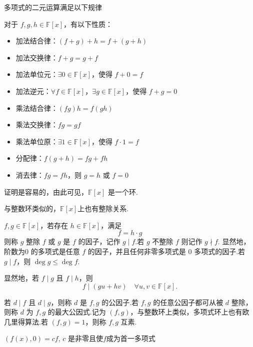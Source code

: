 多项式的二元运算满足以下规律
\begin{proposition}
	对于 \( f, g, h \in \mathbb{F}[x] \)，有以下性质：
	
	\begin{itemize}
		\item[A1.] 加法结合律：\( (f + g) + h = f + (g + h) \)
		\item[A2.] 加法交换律：\( f + g = g + f \)
		\item[A3.] 加法单位元：\( \exists 0 \in \mathbb{F}[x] \)，使得 \( f + 0 = f \)
		\item[A4.] 加法逆元：\( \forall f \in \mathbb{F}[x] \)，\( \exists g \in \mathbb{F}[x] \)，使得 \( f + g = 0 \)
		\item[M1.] 乘法结合律：\( (fg)h = f(gh) \)
		\item[M2.] 乘法交换律：\( fg = gf \)
		\item[M3.] 乘法单位原：\( \exists 1 \in \mathbb{F}[x] \)，使得 \( f \cdot 1 = f \)
		\item[D1.] 分配律：\( f(g + h) = fg + fh \)
		\item[D2.] 消去律：\( fg = fh \)，则 \( g = h \) 或 \( f = 0 \)
	\end{itemize}

\end{proposition}
	
证明是容易的，由此可见，\( \mathbb{F}[x] \) 是一个环.

与整数环类似的，\( \mathbb{F}[x] \)上也有整除关系.
\begin{definition}\label{p1:concept:c1-l634}
	\( f, g \in \mathbb{F}[x] \)，若存在 \( h \in \mathbb{F}[x] \)，满足
	\[ f = h \cdot g \]
	则称 \( g \) 整除 \( f \) 或 \( g \) 是 \( f \) 的因子，记作 \( g \mid f \).若 \( g \) 不整除 \( f \) 则记作 \( g \nmid f \).
	显然地，阶数为$0$ 的多项式是任意 \( f \) 的因子，并且任何非零多项式是 $0$ 多项式的因子.若 \( g \mid f \)，则 \( \deg g \leq \deg f \).
	
\end{definition}
显然地，若 \( f \mid g \) 且 \( f \mid h \)，则
\[ f \mid (gu + hv) \quad \forall u, v \in \mathbb{F}[x]. \]

\label{p1:concept:c1-l644}若 \( d \mid f \) 且 \( d \mid g \)，则称 \( d \) 是 \( f, g \) 的公因子.若 \( f, g \) 的任意公因子都可从被 \( d \) 整除，则称 \( d \) 为 \( f, g \) 的最大公因式.记为 \( (f, g) \)，与整数环上类似，多项式环上也有欧几里得算法.若 \( (f, g) = 1 \)，则称 \( f, g \) 互素.

\( (f(x), 0) = cf \), \( c \) 是非零且使$f$成为首一多项式

